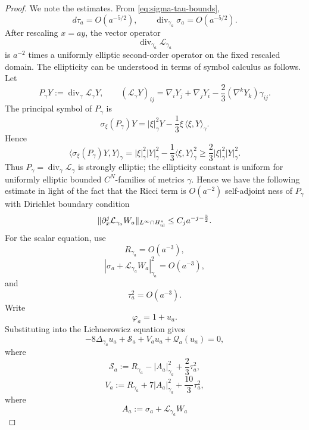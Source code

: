 \documentclass{amsart}
\begin{document}
{\begin{proof}
\noindent We note the estimates. From \eqref{eq:sigma-tau-bounds},
\[
        d\tau_a=O(a^{-5/2}),
        \qquad
        \operatorname{div}_{\gamma_a}\sigma_a=O(a^{-5/2}).
\]
After rescaling \(x=ay\), the vector operator
\[
        \operatorname{div}_{\gamma_a}\mathcal L_{\gamma_a}
\]
is \(a^{-2}\) times a uniformly elliptic second-order operator on the
fixed rescaled domain. The ellipticity can be understood in terms of symbol calculus as follows. 
Let
\[
        P_\gamma Y:=\operatorname{div}_\gamma\mathcal L_\gamma Y,
        \qquad
        (\mathcal L_\gamma Y)_{ij}
        =
        \nabla_iY_j+\nabla_jY_i
        -
        \frac23(\nabla^kY_k)\gamma_{ij}.
\]
The principal symbol of \(P_\gamma\) is
\[
        \sigma_\xi(P_\gamma)Y
        =
        |\xi|_\gamma^2Y
        -
        \frac13\xi\,\langle \xi,Y\rangle_\gamma .
\]
Hence
\[
        \bigl\langle \sigma_\xi(P_\gamma)Y,Y\bigr\rangle_\gamma
        =
        |\xi|_\gamma^2|Y|_\gamma^2
        -
        \frac13\langle \xi,Y\rangle_\gamma^2
        \ge
        \frac{2}{3}|\xi|_\gamma^2|Y|_\gamma^2 .
\]
Thus \(P_\gamma=\operatorname{div}_\gamma\mathcal L_\gamma\) is strongly
elliptic; the ellipticity constant is uniform for uniformly elliptic
bounded \(C^N\)-families of metrics \(\gamma\). Hence we have the following estimate in light of the fact that the Ricci term is $O(a^{-2})$ self-adjoint ness of $P_{\gamma}$ with Dirichlet boundary condition 
\begin{equation}
\label{eq:W-bound-balanced}
        \|\partial_x^j\mathcal L_{\gamma_a}W_a\|_{L^\infty\cap H^s_{\rm ul}}
        \le C_j a^{-j-\frac32}.
\end{equation}
For the scalar equation, use
\[
        R_{\gamma_a}=O(a^{-3}),
\]
\[
        |\sigma_a+\mathcal L_{\gamma_a}W_a|_{\gamma_a}^2=O(a^{-3}),
\]
and
\[
        \tau_a^2=O(a^{-3}).
\]
Write \[ \varphi_a=1+u_a. \] Substituting into the Lichnerowicz equation gives \[ -8\Delta_{\gamma_a}u_a + \mathcal S_a + V_a u_a + \mathcal Q_a(u_a) = 0, \] where \[ \mathcal S_a := R_{\gamma_a} - |A_a|_{\gamma_a}^2 + \frac23\tau_a^2, \] \[ V_a := R_{\gamma_a} + 7|A_a|_{\gamma_a}^2 + \frac{10}{3}\tau_a^2, \] where \[
A_{a}:=\sigma_{a}+\mathcal{L}_{\gamma_{a}}W_{a}
\]
\end{proof}}
\end{document}

